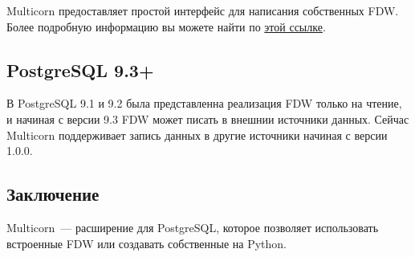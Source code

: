 Multicorn предоставляет простой интерфейс для написания собственных FDW. Более подробную информацию вы можете найти по \href{http://multicorn.org/implementing-an-fdw/}{этой ссылке}.


\subsection{PostgreSQL 9.3+}

В PostgreSQL 9.1 и 9.2 была представленна реализация FDW только на чтение, и начиная с версии 9.3 FDW может писать в внешнии источники данных. Сейчас Multicorn поддерживает запись данных в другие источники начиная с версии 1.0.0.

\subsection{Заключение}

Multicorn~--- расширение для PostgreSQL, которое позволяет использовать встроенные FDW или создавать собственные на Python.